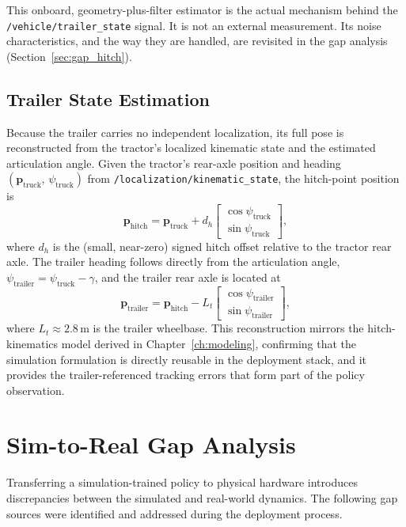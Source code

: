 This onboard, geometry-plus-filter estimator is the actual mechanism behind the \texttt{/vehicle/trailer\_state} signal. It is not an external measurement. Its noise characteristics, and the way they are handled, are revisited in the gap analysis (Section~\ref{sec:gap_hitch}).

\subsection{Trailer State Estimation}
\label{sec:trailer_state}

Because the trailer carries no independent localization, its full pose is reconstructed from the tractor's localized kinematic state and the estimated articulation angle. Given the tractor's rear-axle position and heading $(\mathbf{p}_\text{truck},\, \psi_\text{truck})$ from \texttt{/localization/\allowbreak kinematic\_state}, the hitch-point position is
\begin{equation}
    \mathbf{p}_\text{hitch} = \mathbf{p}_\text{truck} + d_h \begin{bmatrix} \cos\psi_\text{truck} \\ \sin\psi_\text{truck} \end{bmatrix},
\end{equation}
where $d_h$ is the (small, near-zero) signed hitch offset relative to the tractor rear axle. The trailer heading follows directly from the articulation angle, $\psi_\text{trailer} = \psi_\text{truck} - \gamma$, and the trailer rear axle is located at
\begin{equation}
    \mathbf{p}_\text{trailer} = \mathbf{p}_\text{hitch} - L_t \begin{bmatrix} \cos\psi_\text{trailer} \\ \sin\psi_\text{trailer} \end{bmatrix},
\end{equation}
where $L_t \approx 2.8$\,m is the trailer wheelbase. This reconstruction mirrors the hitch-kinematics model derived in Chapter~\ref{ch:modeling}, confirming that the simulation formulation is directly reusable in the deployment stack, and it provides the trailer-referenced tracking errors that form part of the policy observation.

\section{Sim-to-Real Gap Analysis}

Transferring a simulation-trained policy to physical hardware introduces discrepancies between the simulated and real-world dynamics. The following gap sources were identified and addressed during the deployment process.

